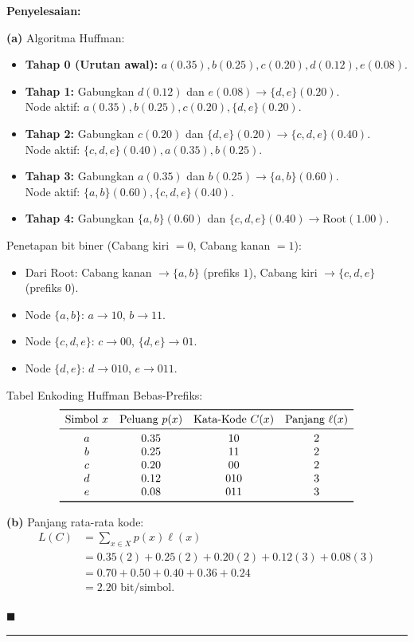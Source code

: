 \documentclass[11pt,a4paper]{article}
\newenvironment{solusi}{\noindent\textbf{\textsf{Penyelesaian:}}\par\vspace{0.2em}}{\hfill$\blacksquare$\vspace{1em}\par\hrule\vspace{1em}}
\begin{document}
\begin{solusi}
\textbf{(a)} Algoritma Huffman:
\begin{itemize}[leftmargin=*]
    \item \textbf{Tahap 0 (Urutan awal):} $a(0.35), b(0.25), c(0.20), d(0.12), e(0.08)$.
    \item \textbf{Tahap 1:} Gabungkan $d(0.12)$ dan $e(0.08) \to \{d, e\}(0.20)$.\\
    Node aktif: $a(0.35), b(0.25), c(0.20), \{d, e\}(0.20)$.
    \item \textbf{Tahap 2:} Gabungkan $c(0.20)$ dan $\{d, e\}(0.20) \to \{c, d, e\}(0.40)$.\\
    Node aktif: $\{c, d, e\}(0.40), a(0.35), b(0.25)$.
    \item \textbf{Tahap 3:} Gabungkan $a(0.35)$ dan $b(0.25) \to \{a, b\}(0.60)$.\\
    Node aktif: $\{a, b\}(0.60), \{c, d, e\}(0.40)$.
    \item \textbf{Tahap 4:} Gabungkan $\{a, b\}(0.60)$ dan $\{c, d, e\}(0.40) \to \text{Root}(1.00)$.
\end{itemize}
Penetapan bit biner (Cabang kiri $= 0$, Cabang kanan $= 1$):
\begin{itemize}
    \item Dari Root: Cabang kanan $\to \{a, b\}$ (prefiks $1$), Cabang kiri $\to \{c, d, e\}$ (prefiks $0$).
    \item Node $\{a, b\}$: $a \to 10$, $b \to 11$.
    \item Node $\{c, d, e\}$: $c \to 00$, $\{d, e\} \to 01$.
    \item Node $\{d, e\}$: $d \to 010$, $e \to 011$.
\end{itemize}
Tabel Enkoding Huffman Bebas-Prefiks:
\[
\begin{array}{cccc}
\toprule
\text{Simbol } x & \text{Peluang } p(x) & \text{Kata-Kode } C(x) & \text{Panjang } \ell(x) \\
\midrule
a & 0.35 & 10 & 2 \\
b & 0.25 & 11 & 2 \\
c & 0.20 & 00 & 2 \\
d & 0.12 & 010 & 3 \\
e & 0.08 & 011 & 3 \\
\bottomrule
\end{array}
\]

\textbf{(b)} Panjang rata-rata kode:
\begin{align*}
L(C) &= \sum_{x \in X} p(x) \ell(x) \\
&= 0.35(2) + 0.25(2) + 0.20(2) + 0.12(3) + 0.08(3) \\
&= 0.70 + 0.50 + 0.40 + 0.36 + 0.24 \\
&= 2.20 \text{ bit/simbol}.
\end{align*}


\end{solusi}
\end{document}
